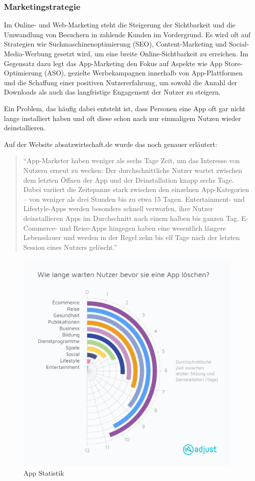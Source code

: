 \subsubsection{Marketingstrategie}

Im Online- und Web-Marketing steht die Steigerung der Sichtbarkeit und die Umwandlung von Besuchern in zahlende 
Kunden im Vordergrund. Es wird oft auf Strategien wie Suchmaschinenoptimierung (SEO), Content-Marketing und 
Social-Media-Werbung gesetzt wird, um eine breite Online-Sichtbarkeit zu erreichen. Im Gegensatz dazu legt das 
App-Marketing den Fokus auf Aspekte wie App Store-Optimierung (ASO), gezielte 
Werbekampagnen innerhalb von App-Plattformen und die Schaffung einer positiven Nutzererfahrung, um sowohl die Anzahl 
der Downloads als auch das langfristige Engagement der Nutzer zu steigern.
\cite{marketingstrategie} 

Ein Problem, das häufig dabei entsteht ist, dass Personen eine App oft gar nicht lange installiert haben und oft diese 
schon nach nur einmaligem Nutzen wieder deinstallieren.

Auf der Website absatzwirtschaft.de wurde das noch genauer erläutert: \cite{deinstallieren}

\begin{quotation}
"`App-Marketer haben weniger als sechs Tage Zeit, um das Interesse von Nutzern erneut zu wecken: Der durchschnittliche
Nutzer wartet zwischen dem letzten Öffnen der App und der Deinstallation knapp sechs Tage. Dabei variiert die
Zeitspanne stark zwischen den einzelnen App-Kategorien – von weniger als drei Stunden bis zu etwa 15 Tagen.
Entertainment- und Lifestyle-Apps werden besonders schnell verworfen, ihre Nutzer deinstallieren Apps im Durchschnitt 
nach einem halben bis ganzen Tag. E-Commerce- und Reise-Apps hingegen haben eine wesentlich längere Lebensdauer und 
werden in der Regel zehn bis elf Tage nach der letzten Session eines Nutzers gelöscht."' 
\end{quotation}

\begin{figure}[H]
    \centering
    \includegraphics[height=\textwidth]{./pics/deinstallieren.png}
    \caption{App Statistik \cite{deinstallieren}}
\end{figure}
